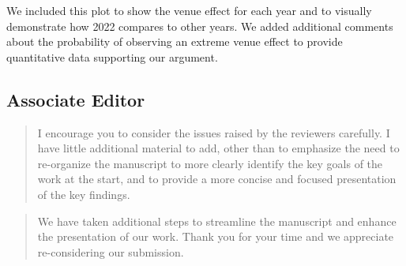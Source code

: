 \documentclass[12pt]{article}
\newenvironment{comment}%
{\begin{quotation}\noindent\small\it\color{darkblue}\ignorespaces%
}{\end{quotation}}
\begin{document}
We included this plot to show the venue effect for each year and to visually
demonstrate how 2022 compares to other years.  We added additional comments
about the probability of observing an extreme venue effect to provide
quantitative data supporting our argument.



\subsection*{Associate Editor}
\begin{comment}
I encourage you to consider the issues raised by the reviewers carefully. I have
little additional material to add, other than to emphasize the need to
re-organize the manuscript to more clearly identify the key goals of the work at
the start, and to provide a more concise and focused presentation of the key
findings.
\end{comment}

\begin{comment}
We have taken additional steps to streamline the manuscript and enhance the
presentation of our work. Thank you for your time and we appreciate re-considering
our submission.
\end{comment}

%
%
\end{document}
